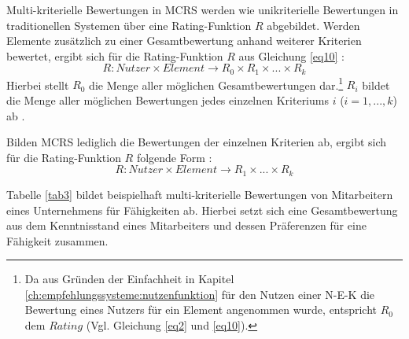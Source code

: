 
Multi-kriterielle Bewertungen in \ac{MCRS} werden wie unikriterielle Bewertungen in traditionellen Systemen über eine Rating-Funktion $R$ abgebildet.
Werden Elemente zusätzlich zu einer Gesamtbewertung anhand weiterer Kriterien bewertet, ergibt sich für die Rating-Funktion $R$ aus Gleichung \ref{eq10} \cite[S. 853]{adomavicius:4:inbook}:
\begin{equation}\label{eq11}
    R: Nutzer \times Element \rightarrow R_{0} \times R_{1} \times ... \times R_{k}
\end{equation}
Hierbei stellt $R_{0}$ die Menge aller möglichen Gesamtbewertungen dar.\footnote{Da aus Gründen der Einfachheit in Kapitel \ref{ch:empfehlungssysteme:nutzenfunktion} für den Nutzen einer \ac{N-E-K} die Bewertung eines Nutzers für ein Element angenommen wurde, entspricht $R_{0}$ dem $Rating$ (Vgl. Gleichung \ref{eq2} und \ref{eq10}).}
$R_{i}$ bildet die Menge aller möglichen Bewertungen jedes einzelnen Kriteriums $i$ ($i=1,...,k$) ab \cite[S. 49]{adomavicius:inproceedings:2}.

Bilden \ac{MCRS} lediglich die Bewertungen der einzelnen Kriterien ab, ergibt sich für die Rating-Funktion $R$ folgende Form \cite[S. 853]{adomavicius:4:inbook}:
\begin{equation}\label{eq12}
    R: Nutzer \times Element \rightarrow R_{1} \times ... \times R_{k}
\end{equation}

Tabelle \ref{tab3} bildet beispielhaft multi-kriterielle Bewertungen von Mitarbeitern eines Unternehmens für Fähigkeiten ab.
Hierbei setzt sich eine Gesamtbewertung aus dem Kenntnisstand eines Mitarbeiters und dessen Präferenzen für eine Fähigkeit zusammen.

